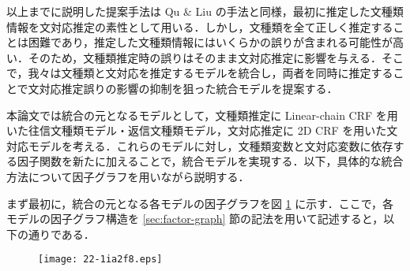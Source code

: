 \documentclass[japanese]{jnlp_1.4}
\begin{document}
以上までに説明した提案手法は Qu \& Liu の手法と同様，最初に推定した文種類情報を文対応推定の素性として用いる．しかし，文種類を全て正しく推定することは困難であり，推定した文種類情報にはいくらかの誤りが含まれる可能性が高い．そのため，文種類推定時の誤りはそのまま文対応推定に影響を与える．そこで，我々は文種類と文対応を推定するモデルを統合し，両者を同時に推定することで文対応推定誤りの影響の抑制を狙った統合モデルを提案する．

本論文では統合の元となるモデルとして，文種類推定に Linear-chain CRF を用いた往信文種類モデル・返信文種類モデル，文対応推定に 2D CRF を用いた文対応モデルを考える．これらのモデルに対し，文種類変数と文対応変数に依存する因子関数を新たに加えることで，統合モデルを実現する．以下，具体的な統合方法について因子グラフを用いながら説明する．

まず最初に，統合の元となる各モデルの因子グラフを図 \ref{fig:model-before} に示す．ここで，各モデルの因子グラフ構造を \ref{sec:factor-graph} 節の記法を用いて記述すると，以下の通りである．
\vspace{1\Cvs}

\begin{figure}[b]
\begin{center}
\texttt{[image: 22-1ia2f8.eps]}
\end{center}
\label{fig:model-before}
\end{figure}
\end{document}
